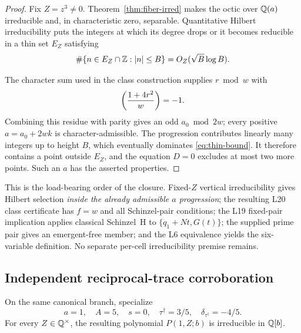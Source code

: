 \begin{proof}
Fix $Z=z^3\ne0$.  Theorem~\ref{thm:fiber-irred} makes the octic over
$\mathbb{Q}(a)$ irreducible and, in characteristic zero, separable.  Quantitative
Hilbert irreducibility puts the integers at which its degree drops or it
becomes reducible in a thin set $E_Z$ satisfying
\begin{equation}
 \#\{n\in E_Z\cap\mathbb{Z}:|n|\le B\}
   =O_Z(\sqrt B\log B).                 \label{eq:thin-bound}
\end{equation}
\cite{cohenhit}\cite[Section~13, Theorems~1--2]{serremw}

The character sum used in the class construction supplies
$r\bmod w$ with
\[
 \left(\frac{1+4r^2}{w}\right)=-1.
\]
Combining this residue with parity gives an odd
$a_0\bmod 2w$; every positive $a=a_0+2wk$ is character-admissible.
The progression contributes linearly many integers up to height $B$,
which eventually dominates \eqref{eq:thin-bound}.  It therefore contains
a point outside $E_Z$, and the equation $D=0$ excludes at most two more
points.  Such an $a$ has the asserted properties.
\end{proof}

This is the load-bearing order of the closure.  Fixed-$Z$ vertical
irreducibility gives Hilbert selection \emph{inside the already admissible
$a$ progression}; the resulting L20 class certificate has $f=w$ and all
Schinzel-pair conditions; the L19 fixed-pair implication applies classical
Schinzel~H to $\{q_1+Nt,G(t)\}$; the supplied prime pair gives an
emergent-free member; and the L6 equivalence yields the six-variable
definition.  No separate per-cell irreducibility premise remains.

\subsection{Independent reciprocal-trace corroboration}

\begin{theorem}
\label{thm:reciprocal-fixed}
On the same canonical branch, specialize
\[
 a=1,\quad A=5,\quad s=0,\quad
 \tau^\dagger=3/5,\quad\delta_{\tau^\dagger}=-4/5.
\]
For every $Z\in\mathbb{Q}^\times$, the resulting polynomial $P(1,Z;b)$ is
irreducible in $\mathbb{Q}[b]$.
\end{theorem}

